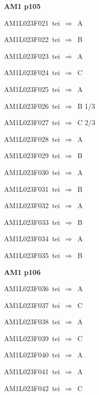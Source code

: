 \par\vfill\eject
{\bf\hfill AM1 p105\hfill\hbox{}}\par\bigskip
{\sixrm AM1L023F021\ {\sixit tei}\ }$\Rightarrow$\ A\par\smallskip
{\sixrm AM1L023F022\ {\sixit tei}\ }$\Rightarrow$\ B\par\smallskip
{\sixrm AM1L023F023\ {\sixit tei}\ }$\Rightarrow$\ A\par\smallskip
{\sixrm AM1L023F024\ {\sixit tei}\ }$\Rightarrow$\ C\par\smallskip
{\sixrm AM1L023F025\ {\sixit tei}\ }$\Rightarrow$\ A\par\smallskip
{\sixrm AM1L023F026\ {\sixit tei}\ }$\Rightarrow$\ B 1/3\par\smallskip
{\sixrm AM1L023F027\ {\sixit tei}\ }$\Rightarrow$\ C 2/3\par\smallskip
{\sixrm AM1L023F028\ {\sixit tei}\ }$\Rightarrow$\ A\par\smallskip
{\sixrm AM1L023F029\ {\sixit tei}\ }$\Rightarrow$\ B\par\smallskip
{\sixrm AM1L023F030\ {\sixit tei}\ }$\Rightarrow$\ A\par\smallskip
{\sixrm AM1L023F031\ {\sixit tei}\ }$\Rightarrow$\ B\par\smallskip
{\sixrm AM1L023F032\ {\sixit tei}\ }$\Rightarrow$\ A\par\smallskip
{\sixrm AM1L023F033\ {\sixit tei}\ }$\Rightarrow$\ B\par\smallskip
{\sixrm AM1L023F034\ {\sixit tei}\ }$\Rightarrow$\ A\par\smallskip
{\sixrm AM1L023F035\ {\sixit tei}\ }$\Rightarrow$\ B\par\smallskip

\par\vfill\eject
{\bf\hfill AM1 p106\hfill\hbox{}}\par\bigskip
{\sixrm AM1L023F036\ {\sixit tei}\ }$\Rightarrow$\ A\par\smallskip
{\sixrm AM1L023F037\ {\sixit tei}\ }$\Rightarrow$\ C\par\smallskip
{\sixrm AM1L023F038\ {\sixit tei}\ }$\Rightarrow$\ A\par\smallskip
{\sixrm AM1L023F039\ {\sixit tei}\ }$\Rightarrow$\ C\par\smallskip
{\sixrm AM1L023F040\ {\sixit tei}\ }$\Rightarrow$\ A\par\smallskip
{\sixrm AM1L023F041\ {\sixit tei}\ }$\Rightarrow$\ A\par\smallskip
{\sixrm AM1L023F042\ {\sixit tei}\ }$\Rightarrow$\ C\par\smallskip

